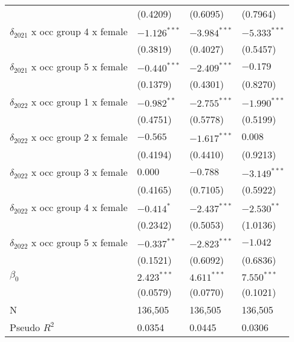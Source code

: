 \begin{tabular}{llll}
                                       &           (0.4209) &           (0.6095) &           (0.7964) \\
$\delta_{2021}$ x occ group 4 x female &     $-1.126^{***}$ &     $-3.984^{***}$ &     $-5.333^{***}$ \\
                                       &           (0.3819) &           (0.4027) &           (0.5457) \\
$\delta_{2021}$ x occ group 5 x female &     $-0.440^{***}$ &     $-2.409^{***}$ &           $-0.179$ \\
                                       &           (0.1379) &           (0.4301) &           (0.8270) \\
$\delta_{2022}$ x occ group 1 x female &      $-0.982^{**}$ &     $-2.755^{***}$ &     $-1.990^{***}$ \\
                                       &           (0.4751) &           (0.5778) &           (0.5199) \\
$\delta_{2022}$ x occ group 2 x female &           $-0.565$ &     $-1.617^{***}$ &            $0.008$ \\
                                       &           (0.4194) &           (0.4410) &           (0.9213) \\
$\delta_{2022}$ x occ group 3 x female &            $0.000$ &           $-0.788$ &     $-3.149^{***}$ \\
                                       &           (0.4165) &           (0.7105) &           (0.5922) \\
$\delta_{2022}$ x occ group 4 x female &         $-0.414^*$ &     $-2.437^{***}$ &      $-2.530^{**}$ \\
                                       &           (0.2342) &           (0.5053) &           (1.0136) \\
$\delta_{2022}$ x occ group 5 x female &      $-0.337^{**}$ &     $-2.823^{***}$ &           $-1.042$ \\
                                       &           (0.1521) &           (0.6092) &           (0.6836) \\
$\beta_0$                              &      $2.423^{***}$ &      $4.611^{***}$ &      $7.550^{***}$ \\
                                       &           (0.0579) &           (0.0770) &           (0.1021) \\
N                                      &            136,505 &            136,505 &            136,505 \\
Pseudo $R^2$                           &             0.0354 &             0.0445 &             0.0306 \\
\bottomrule
\end{tabular}
